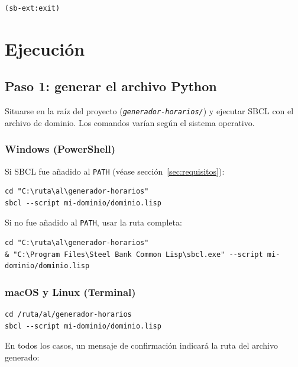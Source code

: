 \documentclass[12pt,a4paper]{article}
\newcommand{\code}[1]{\texttt{#1}}
\newcommand{\file}[1]{\texttt{\textit{#1}}}
\begin{document}
\begin{lstlisting}[style=lisp]
(sb-ext:exit)
\end{lstlisting}

\section{Ejecución}
\label{sec:ejecucion}

\subsection{Paso 1: generar el archivo Python}

Situarse en la raíz del proyecto (\file{generador-horarios/}) y ejecutar
SBCL con el archivo de dominio. Los comandos varían según el sistema
operativo.

\subsubsection*{Windows (PowerShell)}

Si SBCL fue añadido al \code{PATH} (véase sección~\ref{sec:requisitos}):

\begin{lstlisting}[style=shell]
cd "C:\ruta\al\generador-horarios"
sbcl --script mi-dominio/dominio.lisp
\end{lstlisting}

Si no fue añadido al \code{PATH}, usar la ruta completa:

\begin{lstlisting}[style=shell]
cd "C:\ruta\al\generador-horarios"
& "C:\Program Files\Steel Bank Common Lisp\sbcl.exe" --script mi-dominio/dominio.lisp
\end{lstlisting}

\subsubsection*{macOS y Linux (Terminal)}

\begin{lstlisting}[style=shell]
cd /ruta/al/generador-horarios
sbcl --script mi-dominio/dominio.lisp
\end{lstlisting}

En todos los casos, un mensaje de confirmación indicará la ruta del
archivo generado:
\end{document}
